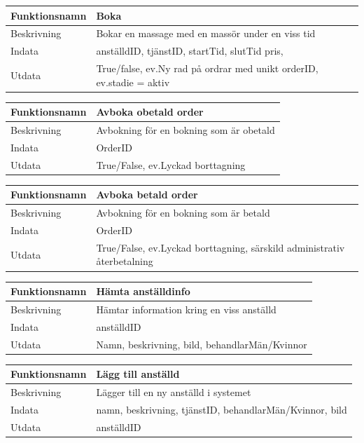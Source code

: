 \documentclass[11pt, titlepage, oneside, a4paper]{article}	%
\begin{document}
\begin{tabular}{ll}
\hline
Funktionsnamn & Boka                  \\ \hline
Beskrivning   & Bokar en massage med en massör under en viss tid \\ \hline
Indata        & anställdID, tjänstID, startTid, slutTid pris, \\ \hline
Utdata        & True/false, ev.Ny rad på ordrar med unikt orderID, ev.stadie = aktiv            \\ \hline
\end{tabular}

\begin{tabular}{ll}
\hline
Funktionsnamn & Avboka obetald order                  \\ \hline
Beskrivning   & Avbokning för en bokning som är obetald \\ \hline
Indata        & OrderID \\ \hline
Utdata        & True/False, ev.Lyckad borttagning     \\ \hline
\end{tabular}

\begin{tabular}{ll}
\hline
Funktionsnamn & Avboka betald order                  \\ \hline
Beskrivning   & Avbokning för en bokning som är betald \\ \hline
Indata        & OrderID \\ \hline
Utdata        & True/False, ev.Lyckad borttagning, särskild administrativ återbetalning  \\ \hline
\end{tabular}

\begin{tabular}{ll}
\hline
Funktionsnamn & Hämta anställdinfo                  \\ \hline
Beskrivning   & Hämtar information kring en viss anställd \\ \hline
Indata        & anställdID \\ \hline
Utdata        & Namn, beskrivning, bild, behandlarMän/Kvinnor  \\ \hline
\end{tabular}

\begin{tabular}{ll}
\hline
Funktionsnamn & Lägg till anställd                 \\ \hline
Beskrivning   & Lägger till en ny anställd i systemet \\ \hline
Indata        & namn, beskrivning, tjänstID, behandlarMän/Kvinnor, bild \\ \hline
Utdata        & anställdID  \\ \hline
\end{tabular}
\end{document}
